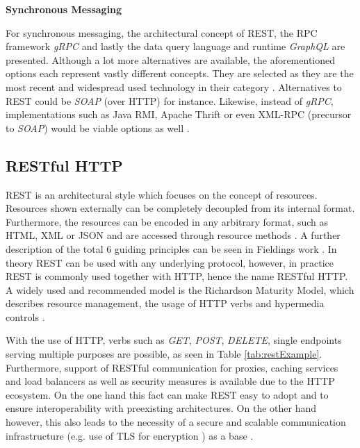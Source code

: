 \textbf{Synchronous Messaging}

For synchronous messaging, the architectural concept of \ac{REST}, the \ac{RPC} framework \textit{gRPC} and lastly the data query language and runtime \textit{GraphQL} are presented.
Although a lot more alternatives are available, the aforementioned options each represent vastly different concepts.
They are selected as they are the most recent and widespread used technology in their category \cite{Mohilo.2019}\cite{Smith.382018}.
Alternatives to \ac{REST} could be \textit{SOAP} (over \ac{HTTP}) for instance.
Likewise, instead of \textit{gRPC}, implementations such as Java RMI, Apache Thrift or even XML-RPC (precursor to \textit{SOAP}) would be viable options as well \cite{Giro.2019}\cite[p.~62f.]{Bruce.2019}.

\subsection{RESTful HTTP}\label{cha:Technologies:communication:rest}

\acf{REST} is an architectural style which focuses on the concept of resources.
Resources shown externally can be completely decoupled from its internal format.
Furthermore, the resources can be encoded in any arbitrary format, such as \ac{HTML}, \ac{XML} or \ac{JSON} and are accessed through resource methods \cite{Restfulapi.net.23.05.2020}.
A further description of the total 6 guiding principles can be seen in Fieldings work \cite{Fielding.15.03.2002}.
In theory \ac{REST} can be used with any underlying protocol, however, in practice \ac{REST} is commonly used together with \ac{HTTP}, hence the name RESTful \ac{HTTP}.
A widely used and recommended model is the Richardson Maturity Model, which describes resource management, the usage of \ac{HTTP} verbs and hypermedia controls \cite{Fowler.2010}.

With the use of \ac{HTTP}, verbs such as \textit{GET}, \textit{POST}, \textit{DELETE}, single endpoints serving multiple purposes are possible, as seen in Table \ref{tab:restExample}.
Furthermore, support of RESTful communication for proxies, caching services and load balancers as well as security measures is available due to the \ac{HTTP} ecosystem.
On the one hand this fact can make \ac{REST} easy to adopt and to ensure interoperability with preexisting architectures.
On the other hand however, this also leads to the necessity of a secure and scalable communication infrastructure (e.g. use of \ac{TLS} for encryption ) as a base \cite[p.~100]{Newman.2015}.

